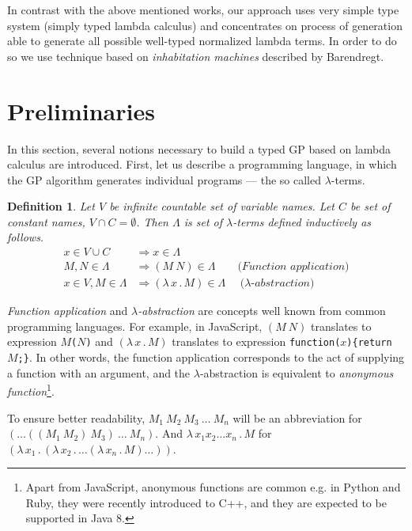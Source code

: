 \documentclass{sig-alternate}
\newtheorem{definition}{Definition}
\newcommand{\lets}{let us\xspace}
\newcommand{\lterms}{$\lambda$-terms\xspace}
\newcommand{\then}{\Rightarrow\xspace}
\newcommand{\lamb}[2]{( \lambda \, #1 \, . \, #2 )}
\newcommand{\lam}[2]{\lambda \, #1 \, . \, #2}
\newcommand{\red}[1]{{\color{red} #1}}
\begin{document}
In contrast with the above mentioned works, our approach uses very simple type system (simply typed lambda calculus) and concentrates on process of generation  
able to generate all possible well-typed normalized lambda terms. In order to do so we use technique based on \textit{inhabitation machines} described by Barendregt\cite{barendregt10}.    

\section{Preliminaries}
\label{preliminaries}


In this section, several notions necessary to build a typed GP based on lambda calculus are introduced. 
First, \lets describe a programming language, 
in which the GP algorithm generates individual programs --- the so called \lterms.

\begin{definition}
Let $V$ be infinite countable set of {\it 
variable names}. Let $C$ be set of {\it constant names}, 
$V \cap C = \emptyset$.	 	
Then $\Lambda$ is set of {\it \lterms} defined inductively as follows.	
\begin{align*}
x   \in V \cup C  &\then x     \in \Lambda \\
M,N \in \Lambda   &\then (M~N) \in \Lambda 
\textit{~~~~~~(Function application)} \\
x   \in V , M \in \Lambda &\then \lamb{x}{M} \in \Lambda
\textit{~~~~($\lambda$-abstraction)} 
\end{align*}
\end{definition}


\textit{Function application} and 
\textit{$\lambda$-abstraction} are concepts
well known from common programming languages. 
For example, in JavaScript, 
$(M~N)$ translates to expression \texttt{$M$($N$)} and
$\lamb{x}{M}$ translates to expression \texttt{function($x$)\{return $M$;\}}.
In other words, the function application 
corresponds to the act of supplying a function 
with an argument, and
the $\lambda$-abstraction is equivalent to 
\textit{anonymous function}\footnote{Apart from JavaScript, anonymous functions are common e.g. in Python and Ruby, 
they were recently introduced to C++, and they are expected to be supported in Java 8.}.

To ensure better readability, 
$M_1~M_2~M_3~\dots~M_n$ will be an abbreviation for 
$(\dots((M_1~M_2)~M_3)~\dots~M_n)$.
And $\lam{x_1 x_2 \dots x_n }{M}$  for
$\lamb{x_1}{\lamb{x_2}{\dots\lamb{x_n}{M}\dots}}$.
\end{document}
